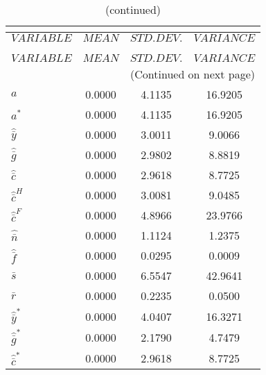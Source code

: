  
\begin{center}
\begin{longtable}{lccc} 
\caption{THEORETICAL MOMENTS}\\
 \label{Table:th_moments}\\
\toprule 
$VARIABLE              $	 & 	 $         MEAN$	 & 	 $    STD. DEV.$	 & 	 $     VARIANCE$\\
\midrule \endfirsthead 
\caption{(continued)}\\
 \toprule \\ 
$VARIABLE              $	 & 	 $         MEAN$	 & 	 $    STD. DEV.$	 & 	 $     VARIANCE$\\
\midrule \endhead 
\midrule \multicolumn{4}{r}{(Continued on next page)} \\ \bottomrule \endfoot 
\bottomrule \endlastfoot 
${a}                   $	 & 	       0.0000	 & 	       4.1135	 & 	      16.9205 \\ 
${a^*}                 $	 & 	       0.0000	 & 	       4.1135	 & 	      16.9205 \\ 
${\hat {\bar y}}       $	 & 	       0.0000	 & 	       3.0011	 & 	       9.0066 \\ 
${\hat {\bar g}}       $	 & 	       0.0000	 & 	       2.9802	 & 	       8.8819 \\ 
${\hat {\bar c}}       $	 & 	       0.0000	 & 	       2.9618	 & 	       8.7725 \\ 
${\hat {\bar c}^H}     $	 & 	       0.0000	 & 	       3.0081	 & 	       9.0485 \\ 
${\hat {\bar c}^F}     $	 & 	       0.0000	 & 	       4.8966	 & 	      23.9766 \\ 
${\hat {\bar n}}       $	 & 	       0.0000	 & 	       1.1124	 & 	       1.2375 \\ 
${\hat {\bar f}}       $	 & 	       0.0000	 & 	       0.0295	 & 	       0.0009 \\ 
${\bar s}              $	 & 	       0.0000	 & 	       6.5547	 & 	      42.9641 \\ 
${\bar r}              $	 & 	       0.0000	 & 	       0.2235	 & 	       0.0500 \\ 
${\hat {\bar y}^*}     $	 & 	       0.0000	 & 	       4.0407	 & 	      16.3271 \\ 
${\hat {\bar g}^*}     $	 & 	       0.0000	 & 	       2.1790	 & 	       4.7479 \\ 
${\hat {\bar c}^*}     $	 & 	       0.0000	 & 	       2.9618	 & 	       8.7725 \\ 

\end{longtable}
\end{center}
